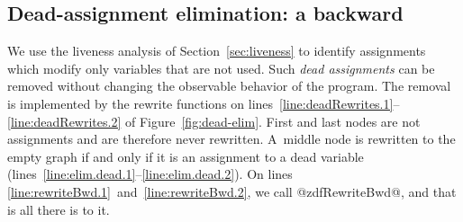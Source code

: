\documentclass[blockstyle,preprint,nocopyrightspace]{sigplanconf}
\newcommand\linepairref[2]{lines \ref{line:#1}~and~\ref{line:#2}}
\newcommand\linerangeref[2]{\mbox{lines~\ref{line:#1}--\ref{line:#2}}}
\newcommand{\authornote}[1]{{\em #1}}
\def\authornote#1{\unskip\relax}
\newcommand{\norman}[1]{\authornote{NR: #1}}
\let\remark\norman
\def\finalremark#1{\relax}
\newcommand\secref[1]{Section~\ref{sec:#1}}
\newcommand\seclabel[1]{\label{sec:#1}}
\newcommand\figref[1]{Figure~\ref{fig:#1}}
\begin{document}
\subsection{Dead-assignment elimination: a backward }


\seclabel{dead-code-elimination}
\seclabel{dead-code-elim}

\seclabel{bwd-rewrite}


\def\liveout{$\mathit{live_{out}}$}

We use the liveness analysis of \secref{liveness} to identify
assignments which modify only variables that are not used.
Such \emph{dead assignments} can be removed without changing the
observable behavior of the program.
The removal is implemented by the rewrite functions on
\linerangeref{deadRewrites.1}{deadRewrites.2} of \figref{dead-elim}. 
First and last nodes are not assignments and are therefore never
rewritten.
A~middle node is rewritten to the empty graph if and only if it is an
assignment to a dead variable (\linerangeref{elim.dead.1}{elim.dead.2}).
On \linepairref{rewriteBwd.1}{rewriteBwd.2}, we call @zdfRewriteBwd@, and
that is all there is to it.
\finalremark{JD: Need to run this version of the code in anger.}
%
\remark{In this space we should have some guff about
composing transformations, which should refer to the example on
eliminating the induction variable.
More generally, list some places dead-assignment elim is used and
include \secref{induction-var-elim}.
}
\end{document}
